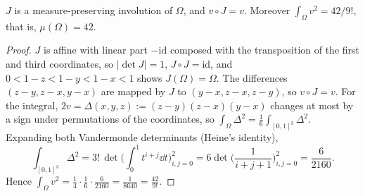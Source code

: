 \documentclass[11pt,colorlinks]{charlie}
\newcommand{\Om}{\Omega}
\begin{document}
\begin{lemma}\label{lem:chamber}
$J$ is a measure-preserving involution of $\Om$, and $v\circ J=v$. Moreover $\int_\Om v^2=42/9!$, that is, $\mu(\Om)=42$.
\end{lemma}
\begin{proof}
$J$ is affine with linear part $-\mathrm{id}$ composed with the transposition of the first and third coordinates, so $|\det J|=1$, $J\circ J=\mathrm{id}$, and $0<1-z<1-y<1-x<1$ shows $J(\Om)=\Om$. The differences $(z-y,z-x,y-x)$ are mapped by $J$ to $(y-x,z-x,z-y)$, so $v\circ J=v$. For the integral, $2v=\Delta(x,y,z):=(z-y)(z-x)(y-x)$ changes at most by a sign under permutations of the coordinates, so $\int_\Om\Delta^2=\frac16\int_{[0,1]^3}\Delta^2$. Expanding both Vandermonde determinants (Heine's identity),
\[
 \int_{[0,1]^3}\Delta^2=3!\,\det\Big(\int_0^1t^{i+j}\dd t\Big)_{i,j=0}^{2}=6\det\Big(\frac1{i+j+1}\Big)_{i,j=0}^{2}=\frac{6}{2160}.
\]
Hence $\int_\Om v^2=\frac14\cdot\frac16\cdot\frac6{2160}=\frac1{8640}=\frac{42}{9!}$.
\end{proof}
\end{document}
